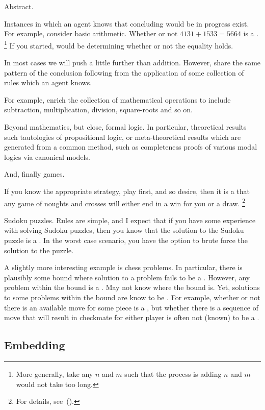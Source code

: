 \begin{note}
  Abstract.

    Instances in which an agent knows that concluding would be in progress exist.
  For example, consider basic arithmetic.
  Whether or not \(4131 + 1533 = 5664\) is a \fc{}.%
  \footnote{
    More generally, take any \(n\) and \(m\) such that the process is adding \(n\) and \(m\) would not take too long.
  }
  If you started, would be determining whether or not the equality holds.

  In most cases we will push a little further than addition.
  However, share the same pattern of the conclusion following from the application of some collection of rules which an agent knows.

  For example, enrich the collection of mathematical operations to include subtraction, multiplication, division, square-roots and so on.

  Beyond mathematics, but close, formal logic.
  In particular, theoretical results such tautologies of propositional logic, or meta-theoretical results which are generated from a common method, such as completeness proofs of various modal logics via canonical models.

  And, finally games.

  If you know the appropriate strategy, play first, and so desire, then it is a  that any game of noughts and crosses will either end in a win for you or a draw.%
  \footnote{
    For details, see~(\cite[94--96]{Gardner:1983wn}).
  }

  Sudoku puzzles.
  Rules are simple, and I expect that if you have some experience with solving Sudoku puzzles, then you know that the solution to the Sudoku puzzle is a \fc{}.
  In the worst case scenario, you have the option to brute force the solution to the puzzle.

  A slightly more interesting example is chess problems.
  In particular, there is plausibly some bound where solution to a problem fails to be a \fc{}.
  However, any problem within the bound is a \fc{}.
  May not know where the bound is.
  Yet, solutions to some problems within the bound are know to be .
  For example, whether or not there is an available move for some piece is a , but whether there is a sequence of move that will result in checkmate for either player is often not (known) to be a .
\end{note}

\subsection{Embedding }
\label{cha:var:ros:Emb}

